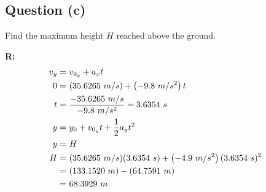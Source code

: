 	\subsection{Question (c)}
		Find the maximum height $H$ reached above the ground.

		\textbf{R:} \newline
		\begin{align}
			v_{y} = \ &v_{0_{y}} + a_{x}t& \notag \\
			0 = \ &(35.6265 \ m/s) + \left( -9.8 \ m/s^{2} \right)t& \notag \\
			t = \ &\frac{-35.6265 \ m/s}{-9.8 \ m/s^{2}} = 3.6354 \ s& \notag \\
			y = \ &y_{0} + v_{0_{y}}t + \frac{1}{2}a_{y}t^{2}& \notag \\
			y = \ &H& \notag \\
			H = \ &(35.6265 \ m/s)(3.6354 \ s) + \left(-4.9 \ m/s^{2}\right)(3.6354 \ s)^{2}& \notag \\
			= \ &(133.1520 \ m) - (64.7591 \ m)& \notag \\
			= \ &68.3929 \ m&
		\end{align}

